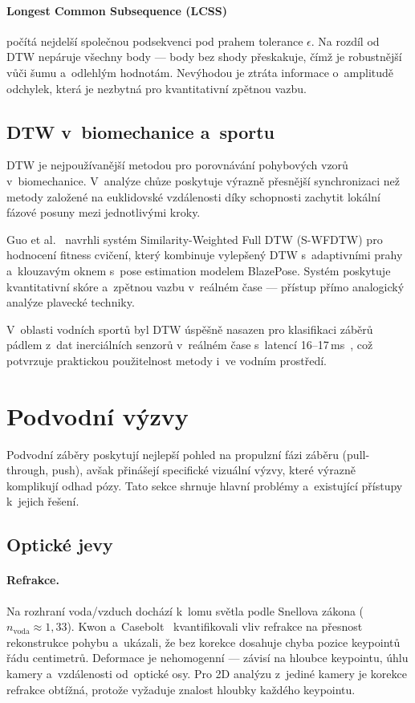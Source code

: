 \paragraph{Longest Common Subsequence (LCSS)} počítá nejdelší společnou podsekvenci pod prahem tolerance $\epsilon$. Na rozdíl od DTW nepáruje všechny body --- body bez shody přeskakuje, čímž je robustnější vůči šumu a~odlehlým hodnotám. Nevýhodou je ztráta informace o~amplitudě odchylek, která je nezbytná pro kvantitativní zpětnou vazbu.

\subsection{DTW v~biomechanice a~sportu}
\label{subsec:dtw_biomechanika}

DTW je nejpoužívanější metodou pro porovnávání pohybových vzorů v~biomechanice. V~analýze chůze poskytuje výrazně přesnější synchronizaci než metody založené na euklidovské vzdálenosti díky schopnosti zachytit lokální fázové posuny mezi jednotlivými kroky.

Guo et al.~\cite{guo2025swfdtw} navrhli systém Similarity-Weighted Full DTW (S-WFDTW) pro hodnocení fitness cvičení, který kombinuje vylepšený DTW s~adaptivními prahy a~klouzavým oknem s~pose estimation modelem BlazePose. Systém poskytuje kvantitativní skóre a~zpětnou vazbu v~reálném čase --- přístup přímo analogický analýze plavecké techniky.

V~oblasti vodních sportů byl DTW úspěšně nasazen pro klasifikaci záběrů pádlem z~dat inerciálních senzorů v~reálném čase s~latencí 16--17\,ms~\cite{paddle2025}, což potvrzuje praktickou použitelnost metody i~ve vodním prostředí.

\section{Podvodní výzvy}
\label{sec:podvodni_vyzvy}

Podvodní záběry poskytují nejlepší pohled na propulzní fázi záběru (pull-through, push), avšak přinášejí specifické vizuální výzvy, které výrazně komplikují odhad pózy. Tato sekce shrnuje hlavní problémy a~existující přístupy k~jejich řešení.

\subsection{Optické jevy}

\paragraph{Refrakce.}
Na rozhraní voda/vzduch dochází k~lomu světla podle Snellova zákona ($n_{\text{voda}} \approx 1{,}33$). Kwon a~Casebolt~\cite{kwon2006refraction} kvantifikovali vliv refrakce na přesnost rekonstrukce pohybu a~ukázali, že bez korekce dosahuje chyba pozice keypointů řádu centimetrů. Deformace je nehomogenní --- závisí na hloubce keypointu, úhlu kamery a~vzdálenosti od~optické osy. Pro 2D analýzu z~jediné kamery je korekce refrakce obtížná, protože vyžaduje znalost hloubky každého keypointu.

